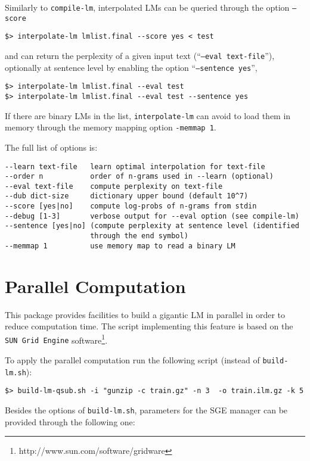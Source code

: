 \documentclass[11pt]{article}
\begin{document}
\noindent
Similarly to {\tt compile-lm}, interpolated LMs can be queried through the option {\tt --score}

\begin{verbatim}
$> interpolate-lm lmlist.final --score yes < test
\end{verbatim}

\noindent
and can return the perplexity of a given input text (``{\tt --eval text-file}''), optionally  at sentence level  by enabling the option ``{\tt --sentence yes}'',

\begin{verbatim}
$> interpolate-lm lmlist.final --eval test 
$> interpolate-lm lmlist.final --eval test --sentence yes
\end{verbatim}

\bigskip
\noindent
If there are binary LMs in the list,  {\tt interpolate-lm} can avoid to load them in memory through the memory 
mapping option {\tt -memmap 1}.


\noindent
The full list of options is:

\begin{verbatim}
--learn text-file   learn optimal interpolation for text-file
--order n           order of n-grams used in --learn (optional)
--eval text-file    compute perplexity on text-file
--dub dict-size     dictionary upper bound (default 10^7)
--score [yes|no]    compute log-probs of n-grams from stdin
--debug [1-3]       verbose output for --eval option (see compile-lm)
--sentence [yes|no] (compute perplexity at sentence level (identified
                    through the end symbol)
--memmap 1          use memory map to read a binary LM
\end{verbatim}
 

 
\newpage
\section{Parallel Computation}
This package provides facilities to build a gigantic LM in parallel in order to reduce computation time.
The script implementing this feature is based on the {\tt SUN Grid Engine} software\footnote{http://www.sun.com/software/gridware}.

\noindent
To apply the parallel computation run the following script (instead of {\tt build-lm.sh}):

\begin{verbatim}
$> build-lm-qsub.sh -i "gunzip -c train.gz" -n 3  -o train.ilm.gz -k 5
\end{verbatim}
Besides the options of {\tt build-lm.sh}, parameters for the SGE manager can be provided through the following one:
\end{document}
